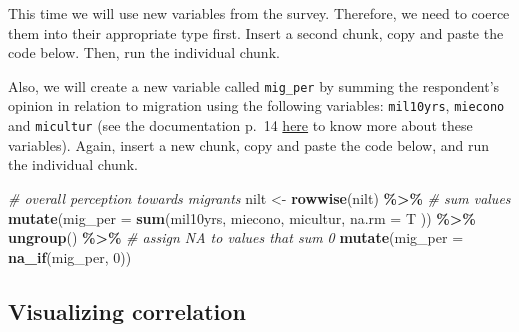 \documentclass[
]{book}
\newenvironment{Shaded}{\begin{snugshade}}{\end{snugshade}}
\newcommand{\AttributeTok}[1]{\textcolor[rgb]{0.13,0.29,0.53}{#1}}
\newcommand{\CommentTok}[1]{\textcolor[rgb]{0.56,0.35,0.01}{\textit{#1}}}
\newcommand{\DecValTok}[1]{\textcolor[rgb]{0.00,0.00,0.81}{#1}}
\newcommand{\FunctionTok}[1]{\textcolor[rgb]{0.13,0.29,0.53}{\textbf{#1}}}
\newcommand{\NormalTok}[1]{#1}
\newcommand{\OtherTok}[1]{\textcolor[rgb]{0.56,0.35,0.01}{#1}}
\newcommand{\SpecialCharTok}[1]{\textcolor[rgb]{0.81,0.36,0.00}{\textbf{#1}}}
\begin{document}
This time we will use new variables from the survey. Therefore, we need to coerce them into their appropriate type first. Insert a second chunk, copy and paste the code below. Then, run the individual chunk.

\begin{Shaded}
\end{Shaded}

Also, we will create a new variable called \texttt{mig\_per} by summing the respondent's opinion in relation to migration using the following variables: \texttt{mil10yrs}, \texttt{miecono} and \texttt{micultur} (see the documentation p.~14 \href{https://www.ark.ac.uk/teaching/NILT2012TeachingResources.pdf}{here} to know more about these variables). Again, insert a new chunk, copy and paste the code below, and run the individual chunk.

\begin{Shaded}
\begin{Highlighting}[]
\CommentTok{\# overall perception towards migrants}
\NormalTok{nilt }\OtherTok{\textless{}{-}} \FunctionTok{rowwise}\NormalTok{(nilt) }\SpecialCharTok{\%\textgreater{}\%} 
  \CommentTok{\# sum values}
  \FunctionTok{mutate}\NormalTok{(}\AttributeTok{mig\_per =} \FunctionTok{sum}\NormalTok{(mil10yrs, miecono, micultur, }\AttributeTok{na.rm =}\NormalTok{ T )) }\SpecialCharTok{\%\textgreater{}\%} 
  \FunctionTok{ungroup}\NormalTok{() }\SpecialCharTok{\%\textgreater{}\%} 
  \CommentTok{\# assign NA to values that sum 0}
  \FunctionTok{mutate}\NormalTok{(}\AttributeTok{mig\_per =}  \FunctionTok{na\_if}\NormalTok{(mig\_per, }\DecValTok{0}\NormalTok{))}
\end{Highlighting}
\end{Shaded}

\hypertarget{visualizing-correlation}{%
\subsection{Visualizing correlation}\label{visualizing-correlation}}
\end{document}
